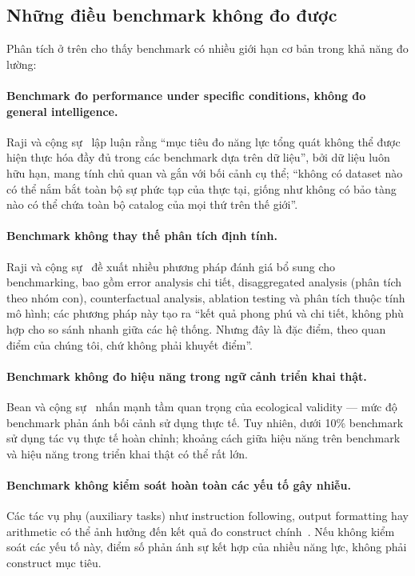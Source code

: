 \subsection{Những điều benchmark không đo được}

Phân tích ở trên cho thấy benchmark có nhiều giới hạn cơ bản trong khả năng đo lường:

\paragraph{Benchmark đo performance under specific conditions, không đo general intelligence.}
Raji và cộng sự~\cite{everything_benchmark} lập luận rằng ``mục tiêu đo năng lực tổng quát không thể được hiện thực hóa đầy đủ trong các benchmark dựa trên dữ liệu'', bởi dữ liệu luôn hữu hạn, mang tính chủ quan và gắn với bối cảnh cụ thể; ``không có dataset nào có thể nắm bắt toàn bộ sự phức tạp của thực tại, giống như không có bảo tàng nào có thể chứa toàn bộ catalog của mọi thứ trên thế giới''.

\paragraph{Benchmark không thay thế phân tích định tính.}
Raji và cộng sự~\cite{everything_benchmark} đề xuất nhiều phương pháp đánh giá bổ sung cho benchmarking, bao gồm error analysis chi tiết, disaggregated analysis (phân tích theo nhóm con), counterfactual analysis, ablation testing và phân tích thuộc tính mô hình; các phương pháp này tạo ra ``kết quả phong phú và chi tiết, không phù hợp cho so sánh nhanh giữa các hệ thống. Nhưng đây là đặc điểm, theo quan điểm của chúng tôi, chứ không phải khuyết điểm''.

\paragraph{Benchmark không đo hiệu năng trong ngữ cảnh triển khai thật.}
Bean và cộng sự~\cite{measuring_what_matters} nhấn mạnh tầm quan trọng của ecological validity --- mức độ benchmark phản ánh bối cảnh sử dụng thực tế. Tuy nhiên, dưới 10\% benchmark sử dụng tác vụ thực tế hoàn chỉnh; khoảng cách giữa hiệu năng trên benchmark và hiệu năng trong triển khai thật có thể rất lớn.

\paragraph{Benchmark không kiểm soát hoàn toàn các yếu tố gây nhiễu.}
Các tác vụ phụ (auxiliary tasks) như instruction following, output formatting hay arithmetic có thể ảnh hưởng đến kết quả đo construct chính~\cite{measuring_what_matters}. Nếu không kiểm soát các yếu tố này, điểm số phản ánh sự kết hợp của nhiều năng lực, không phải construct mục tiêu.


